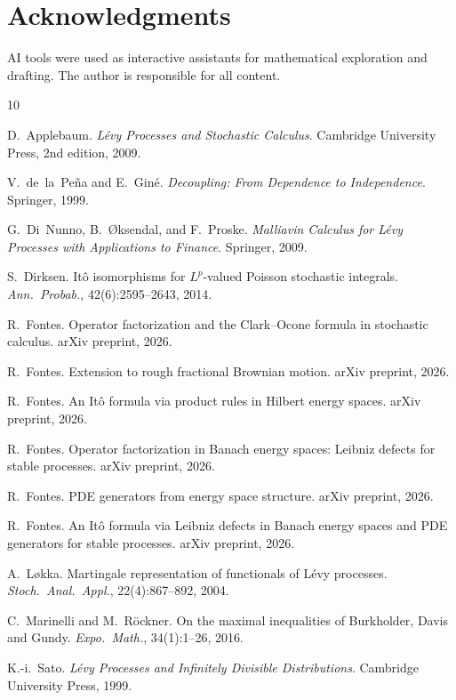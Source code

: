 \documentclass[11pt,a4paper]{article}
\theoremstyle{plain}
\theoremstyle{definition}
\theoremstyle{remark}
\begin{document}
\section*{Acknowledgments}
AI tools were used as interactive assistants for
mathematical exploration and drafting.  The author is
responsible for all content.


\begin{thebibliography}{10}

D.~Applebaum.
\newblock \emph{L\'evy Processes and Stochastic Calculus}.
\newblock Cambridge University Press, 2nd edition, 2009.

V.~de~la~Pe\~na and E.~Gin\'e.
\newblock \emph{Decoupling: From Dependence to Independence}.
\newblock Springer, 1999.

G.~Di~Nunno, B.~{\O}ksendal, and F.~Proske.
\newblock \emph{Malliavin Calculus for L\'evy Processes with
Applications to Finance}.
\newblock Springer, 2009.

S.~Dirksen.
\newblock Itô isomorphisms for $L^p$-valued Poisson stochastic
integrals.
\newblock \emph{Ann.\ Probab.}, 42(6):2595--2643, 2014.

R.~Fontes.
\newblock Operator factorization and the Clark--Ocone formula
in stochastic calculus.
\newblock arXiv preprint, 2026.

R.~Fontes.
\newblock Extension to rough fractional Brownian motion.
\newblock arXiv preprint, 2026.

R.~Fontes.
\newblock An It\^o formula via product rules in Hilbert energy
spaces.
\newblock arXiv preprint, 2026.

R.~Fontes.
\newblock Operator factorization in Banach energy spaces:
Leibniz defects for stable processes.
\newblock arXiv preprint, 2026.

R.~Fontes.
\newblock PDE generators from energy space structure.
\newblock arXiv preprint, 2026.

R.~Fontes.
\newblock An It\^o formula via Leibniz defects in Banach energy
spaces and PDE generators for stable processes.
\newblock arXiv preprint, 2026.

A.~L{\o}kka.
\newblock Martingale representation of functionals of L\'evy
processes.
\newblock \emph{Stoch.\ Anal.\ Appl.}, 22(4):867--892, 2004.

C.~Marinelli and M.~R\"ockner.
\newblock On the maximal inequalities of Burkholder, Davis and
Gundy.
\newblock \emph{Expo.\ Math.}, 34(1):1--26, 2016.

K.-i.~Sato.
\newblock \emph{L\'evy Processes and Infinitely Divisible
Distributions}.
\newblock Cambridge University Press, 1999.

\end{thebibliography}
\end{document}
